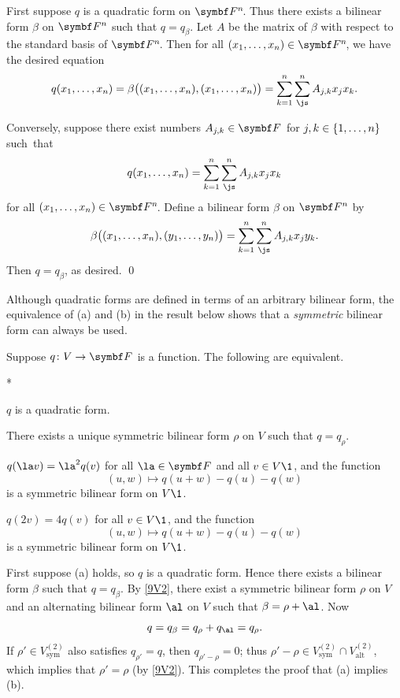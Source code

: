  \proof
 First suppose $q$ is a quadratic form on $\FF n$. Thus there exists a bilinear form $\beta$ on $\F n$ such that $q = q_\beta$. Let $A$ be the matrix of $\beta$ with respect to the standard basis of $\FF n$. Then for all $(x_1, \ldots, x_n) \in \FF n$, we have the desired equation
\vspace{-.04in} %
 \[
 q(x_1, \ldots, x_n) = \beta\paren[\big]{ (x_1, \ldots, x_n), (x_1, \ldots, x_n) }
 = \sum_{k=1}^n \sum_{\js}^n A_{j,k} x_j x_k.
 \]

 Conversely, suppose there exist numbers $A_{j,k} \in \F{}$ for $j, k \in \{ 1, \ldots, n\} $ such~that
  \[
 q(x_1, \ldots, x_n) = \sum_{k=1}^n \sum_{\js}^n A_{j,k} x_j x_k
 \]
 for all $(x_1, \ldots, x_n) \in \FF n$. Define a bilinear form $\beta$ on $\F n$ by
  \[
  \beta\paren[\big]{ (x_1, \ldots, x_n), (y_1, \ldots, y_n) } = \sum_{k=1}^n \sum_{\js}^n A_{j,k} x_j y_k.
  \]
 \vspace{-0.1in}
 Then $q = q_\beta$, as desired.
 \qed

 Although quadratic forms are defined in terms of an arbitrary bilinear form, the equivalence of (a) and (b) in the result below shows that a \textit{symmetric} bilinear form can always be used.

 {Suppose $\fun q V {\F{}}$ is a function. The following are equivalent.
 \begin{subtheorem}*
 \item
 $q$ is a quadratic form.
 \item
 There exists a unique symmetric bilinear form $\rho$ on $V$ such that $q = q_\rho$.
 \item
 $q(\la v) = \la^2 q(v)$ for all $\la \in \F{}$ and all $v \in V\1$, and the function
\vspace{-.02in} %
\[
(u, w) \mapsto q(u+w) - q(u) - q(w)
\]
is a symmetric bilinear form on $V\1$.
\item
$q(2 v) = 4 q(v)$ for all $v \in V\1$, and the function
\vspace{-.02in} %
\[
(u, w) \mapsto q(u+w) - q(u) - q(w)
\]
is a symmetric bilinear form on $V\1$.
\end{subtheorem}}

\proof
First suppose (a) holds, so $q$ is a quadratic form. Hence there exists a bilinear form $\beta$ such that $q = q_\beta$. By \ref{9V2}, there exist a symmetric bilinear form $\rho$ on $V$ and an alternating bilinear form $\al$ on $V$ such that $\beta = \rho + \al$. Now
\[
q = q_\beta = q_\rho + q_\al = q_\rho.
\]
If $\rho' \in V^{(2)}_{\text{sym}}$ also satisfies $q_{\rho'} = q$, then $q_{\rho' - \rho} = 0$; thus
$\rho' - \rho \in V^{(2)}_{\text{sym}} \cap V^{(2)}_{\text{alt}}$,
which implies that $\rho' = \rho$ (by \ref{9V2}). This completes the proof that (a) implies (b).

